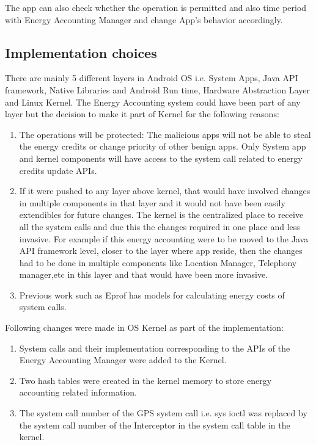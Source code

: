 The app can also check whether the operation is permitted and also time period with Energy Accounting Manager and change App's behavior accordingly. 



\subsection{Implementation choices}

There are mainly 5 different layers in Android OS i.e. System Apps, Java API framework, Native Libraries and Android Run time, Hardware Abstraction Layer and Linux Kernel. The Energy Accounting system could have been part of any layer but the decision to make it part of Kernel for the following reasons:

\begin{enumerate}

\item The operations will be protected: The malicious apps will not be able to steal the energy credits or change priority of other benign apps. Only System app and kernel components will have access to the system call related to energy credits update APIs.

\item If it were pushed to any layer above kernel, that would have involved changes in multiple components in that layer and it would not have been easily extendibles for future changes. The kernel is the centralized place to receive all the system calls and due this the changes required in one place and less invasive. For example if this energy accounting were to be moved to the Java API framework level, closer to the layer where app reside, then the changes had to be done in multiple components like Location Manager, Telephony manager,etc in this layer and that would have been more invasive.

\item Previous work such as Eprof has models for calculating energy costs of system calls. 

\end{enumerate}

Following changes were made in OS Kernel as part of the implementation:

\begin{enumerate}

\item System calls and their implementation corresponding to the APIs of the Energy Accounting Manager were added to the Kernel.
\item Two hash tables were created in the kernel memory to store energy accounting related information.
\item The system call number of the GPS system call i.e. sys ioctl was replaced by the system call number of the Interceptor in the system call table in the kernel.

\end{enumerate}



